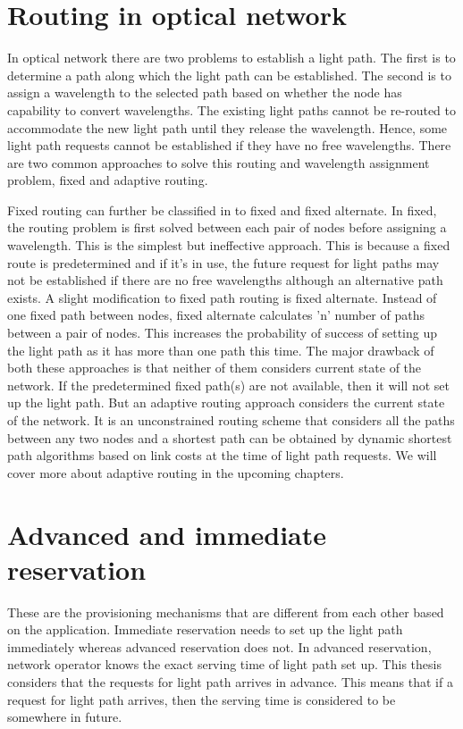 \section{Routing in optical network}

In optical network there are two problems to establish a light path. The first is to determine a path along which the light path can be established. The second is to assign a wavelength to the selected path based on whether the node has capability to convert wavelengths. The existing light paths cannot be re-routed to accommodate the new light path until they release the wavelength. Hence, some light path requests cannot be established if they have no free wavelengths. There are two common approaches to solve this routing and wavelength assignment problem, fixed and adaptive routing.

Fixed routing can further be classified in to fixed and fixed alternate. In fixed, the routing problem is first solved between each pair of nodes before assigning a wavelength. This is the simplest but ineffective approach. This is because a fixed route is predetermined and if it's in use, the future request for light paths may not be established if there are no free wavelengths although an alternative path exists. A slight modification to fixed path routing is fixed alternate. Instead of one fixed path between nodes, fixed alternate calculates 'n' number of paths between a pair of nodes. This increases the probability of success of setting up the light path as it has more than one path this time. The major drawback of both these approaches is that neither of them considers current state of the network. If the predetermined fixed path(s) are not available, then it will not set up the light path. But an adaptive routing approach considers the current state of the network. It is an unconstrained routing scheme that considers all the paths between any two nodes and a shortest path can be obtained by dynamic shortest path algorithms based on link costs at the time of light path requests. We will cover more about adaptive routing in the upcoming chapters.

\section{Advanced and immediate reservation}

These are the provisioning mechanisms that are different from each other based on the application. Immediate reservation needs to set up the light path immediately whereas advanced reservation does not. In advanced reservation, network operator knows the exact serving time of light path set up. This thesis considers that the requests for light path arrives in advance. This means that if a request for light path arrives, then the serving time is considered to be somewhere in future.

